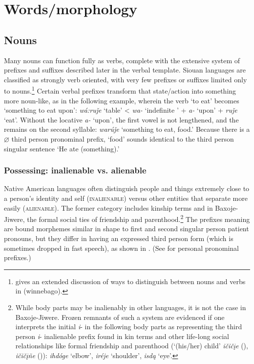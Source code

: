 \documentclass[output=paper]{LSP/langsci}
\begin{document}
\section{Words/morphology}
\subsection{Nouns}   Many nouns can function fully as verbs, complete with the extensive system of prefixes and suffixes described later in the verbal template. Siouan languages are classified as strongly verb oriented, with very few prefixes or suffixes limited only to nouns.\footnote{\citet{Helmbrecht2002} gives an extended discussion of ways to distinguish between nouns and verbs in  (winnebago).} Certain verbal prefixes transform that state/action into something more noun-like, as in the following example, wherein the verb `to eat' becomes `something to eat upon':  \textit{wá:ru\v{j}e} `table' < \textit{wa-} `indefinite ' + \textit{a-} `upon' + \textit{ru\v{j}e} `eat'. Without the locative \textit{a-} `upon', the first vowel is not lengthened, and the  remains on the second syllable: \textit{warú\v{j}e} `something to eat, food.'  Because there is a $\varnothing$ third person pronominal prefix, `food' sounds identical to the third person singular sentence `He ate (something).'

\subsubsection{Possessing: inalienable vs. alienable}  Native American languages often distinguish people and things extremely close to a person's identity and self (\textsc{inalienable}) versus other entities that separate more easily (\textsc{alienable}). The former category includes kinship terms and in Baxoje-Jiwere, the formal social ties of friendship and parenthood.\footnote{While body parts may be inalienably  in other languages, it is not the case in Baxoje-Jiwere. Frozen remnants of such a system are evidenced if one interprets the initial \textit{i}- in the following body parts as representing the third person \textit{i}- inalienable prefix found in kin terms and other life-long social relationships like formal friendship and parenthood (`(his/her) child' \textit{i\v{c}i\v{c}\k{i}e} (), \textit{i\v{c}i\v{c}\k{i}ñe} ()): \textit{ihdóge} `elbow', \textit{iréje} `shoulder', \textit{isd\k{a}} `eye'.} The prefixes meaning  are bound morphemes similar in shape to first and second singular person patient  pronouns, but they differ in having an expressed third person form (which is sometimes dropped in fast speech), as shown in . (See  for personal pronominal prefixes.)
\end{document}
